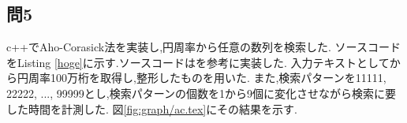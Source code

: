 \subsection*{問5}
c++でAho-Corasick法を実装し,円周率から任意の数列を検索した.
ソースコードをListing \ref{hoge}に示す.ソースコードは\cite{AhoCoras40:online}を参考に実装した.
入力テキストとして\cite{PI10058:online}から円周率100万桁を取得し,整形したものを用いた.
また,検索パターンを11111, 22222, ..., 99999とし,検索パターンの個数を1から9個に変化させながら検索に要した時間を計測した.
図\ref{fig:graph/ac.tex}にその結果を示す.
